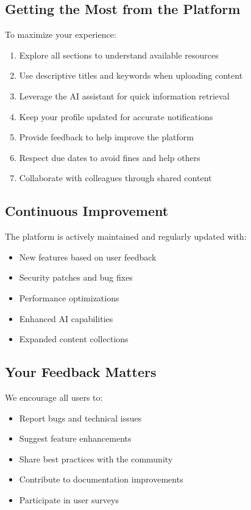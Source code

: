 \documentclass[12pt,a4paper]{article}
\begin{document}
\subsection{Getting the Most from the Platform}

To maximize your experience:
\begin{enumerate}[leftmargin=*]
    \item Explore all sections to understand available resources
    \item Use descriptive titles and keywords when uploading content
    \item Leverage the AI assistant for quick information retrieval
    \item Keep your profile updated for accurate notifications
    \item Provide feedback to help improve the platform
    \item Respect due dates to avoid fines and help others
    \item Collaborate with colleagues through shared content
\end{enumerate}

\subsection{Continuous Improvement}

The platform is actively maintained and regularly updated with:
\begin{itemize}[leftmargin=*]
    \item New features based on user feedback
    \item Security patches and bug fixes
    \item Performance optimizations
    \item Enhanced AI capabilities
    \item Expanded content collections
\end{itemize}

\subsection{Your Feedback Matters}

We encourage all users to:
\begin{itemize}[leftmargin=*]
    \item Report bugs and technical issues
    \item Suggest feature enhancements
    \item Share best practices with the community
    \item Contribute to documentation improvements
    \item Participate in user surveys
\end{itemize}
\end{document}
